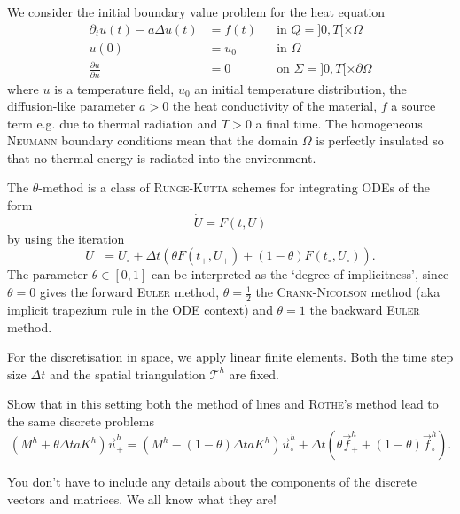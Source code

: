 We consider the initial boundary value problem for the heat equation
\begin{equation}\tag{H}\label{eq:heat}
\begin{aligned}
\partial_t u(t) - a \Delta u(t) &= f(t) && \text{in } Q = ]0,T[ \times \Omega\\
u(0) &= u_0 && \text{in } \Omega\\
\frac{\partial u}{\partial n} &= 0 && \text{on } \Sigma = ]0,T[ \times \partial \Omega
\end{aligned}
\end{equation}
where $u$ is a temperature field, $u_0$ an initial temperature distribution, the diffusion-like parameter $a > 0$ the heat conductivity of the material, $f$ a source term e.g. due to thermal radiation and $T>0$ a final time. The homogeneous \textsc{Neumann} boundary conditions mean that the domain $\Omega$ is perfectly insulated so that no thermal energy is radiated into the environment.

The $\theta$-method is a class of \textsc{Runge-Kutta} schemes for integrating ODEs of the form
\begin{equation*}
\dot{U} = F(t,U)
\end{equation*}
by using the iteration
\begin{equation*}
U_+ = U_\circ + \Delta t \left( \theta F(t_+,U_+) + (1-\theta) F(t_\circ,U_\circ) \right).
\end{equation*}
The parameter $\theta \in [0,1]$ can be interpreted as the `degree of implicitness', since $\theta = 0$ gives the forward \textsc{Euler} method, $\theta = \frac{1}{2}$ the \textsc{Crank-Nicolson} method (aka implicit trapezium rule in the ODE context) and $\theta = 1$ the backward \textsc{Euler} method.

For the discretisation in space, we apply linear finite elements. Both the time step size $\Delta t$ and the spatial triangulation $\mathcal{T}^h$ are fixed.

Show that in this setting both the method of lines and \textsc{Rothe}'s method lead to the same discrete problems
\begin{equation*}
\left( M^h + \theta \Delta t a K^h\right) \vec{u}^h_+ = \left( M^h - (1-\theta)\Delta t a K^h\right) \vec{u}^h_\circ + \Delta t \left( \theta \vec{f}^h_+ + (1-\theta) \vec{f}^h_\circ \right).
\end{equation*}

You don't have to include any details about the components of the discrete vectors and matrices. We all know what they are!

